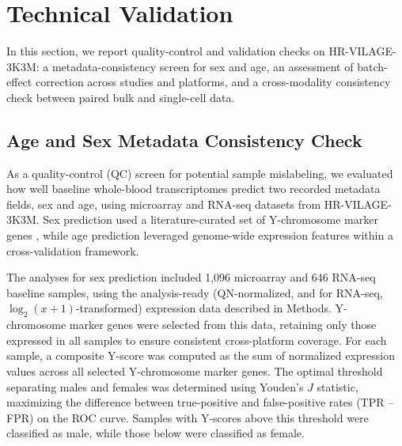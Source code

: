 \documentclass[
  12pt]{article}
\begin{document}
\section{Technical Validation}
In this section, we report quality-control and validation checks on HR-VILAGE-3K3M: a metadata-consistency screen for sex and age, an assessment of batch-effect correction across studies and platforms, and a cross-modality consistency check between paired bulk and single-cell data.

\subsection{Age and Sex Metadata Consistency Check}


As a quality-control (QC) screen for potential sample mislabeling, we evaluated how well baseline whole-blood transcriptomes predict two recorded metadata fields, sex and age, using microarray and RNA-seq datasets from HR-VILAGE-3K3M. Sex prediction used a literature-curated set of Y-chromosome marker genes \citep{ellis2018sex}, while age prediction leveraged genome-wide expression features within a cross-validation framework.

The analyses for sex prediction included 1{,}096 microarray and 646 RNA-seq baseline samples, using the analysis-ready (QN-normalized, and for RNA-seq, $\log_2(x+1)$-transformed) expression data described in Methods. Y-chromosome marker genes were selected from this data, retaining only those expressed in all samples to ensure consistent cross-platform coverage. For each sample, a composite Y-score was computed as the sum of normalized expression values across all selected Y-chromosome marker genes. The optimal threshold separating males and females was determined using Youden’s $J$ statistic\citep{youden1950index}, maximizing the difference between true-positive and false-positive rates (TPR – FPR) on the ROC curve. Samples with Y-scores above this threshold were classified as male, while those below were classified as female.
\end{document}
